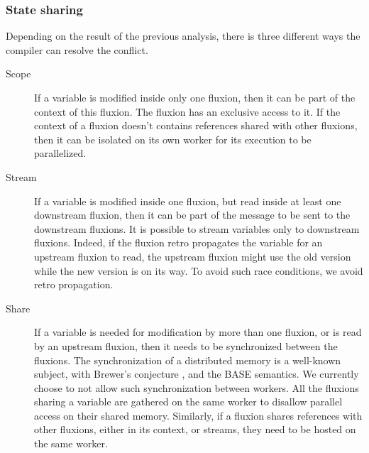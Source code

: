 \subsubsection{State sharing}

Depending on the result of the previous analysis, there is three different ways the compiler can resolve the conflict.

\begin{description}
\item[Scope]
If a variable is modified inside only one fluxion, then it can be part of the context of this fluxion.
The fluxion has an exclusive access to it.
If the context of a fluxion doesn't contains references shared with other fluxions, then it can be isolated on its own worker for its execution to be parallelized.

\item[Stream]
If a variable is modified inside one fluxion, but read inside at least one downstream fluxion, then it can be part of the message to be sent to the downstream fluxions.
It is possible to stream variables only to downstream fluxions.
Indeed, if the fluxion retro propagates the variable for an upstream fluxion to read, the upstream fluxion might use the old version while the new version is on its way.
To avoid such race conditions, we avoid retro propagation.

\item[Share]
If a variable is needed for modification by more than one fluxion, or is read by an upstream fluxion, then it needs to be synchronized between the fluxions.
The synchronization of a distributed memory is a well-known subject, with Brewer's conjecture \cite{Gilbert2002, codahale2010}, and the BASE semantics\cite{Fox1997}.
We currently choose to not allow such synchronization between workers.
All the fluxions sharing a variable are gathered on the same worker to disallow parallel access on their shared memory.
Similarly, if a fluxion shares references with other fluxions, either in its context, or streams, they need to be hosted on the same worker.
\end{description}


\endinput



















































